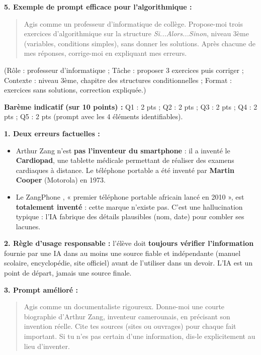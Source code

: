 \documentclass[11pt]{article}
\begin{document}
\begin{corrige}
\textbf{5. Exemple de prompt efficace pour l'algorithmique :}
\begin{quote}
\og Agis comme un professeur d'informatique de collège. Propose-moi trois exercices d'algorithmique sur la structure \emph{Si...Alors...Sinon}, niveau 3ème (variables, conditions simples), sans donner les solutions. Après chacune de mes réponses, corrige-moi en expliquant mes erreurs. \fg
\end{quote}
(Rôle : professeur d'informatique ; Tâche : proposer 3 exercices puis corriger ; Contexte : niveau 3ème, chapitre des structures conditionnelles ; Format : exercices sans solutions, correction expliquée.)

\textbf{Barème indicatif (sur 10 points) :} Q1 : 2 pts ; Q2 : 2 pts ; Q3 : 2 pts ; Q4 : 2 pts ; Q5 : 2 pts (prompt avec les 4 éléments identifiables).
\end{corrige}

\begin{corrige}
\textbf{1. Deux erreurs factuelles :}
\begin{itemize}
    \item Arthur Zang n'est \textbf{pas l'inventeur du smartphone} : il a inventé le \textbf{Cardiopad}, une tablette médicale permettant de réaliser des examens cardiaques à distance. Le téléphone portable a été inventé par \textbf{Martin Cooper} (Motorola) en 1973.
    \item Le \og ZangPhone \fg, « premier téléphone portable africain lancé en 2010 », est \textbf{totalement inventé} : cette marque n'existe pas. C'est une hallucination typique : l'IA fabrique des détails plausibles (nom, date) pour combler ses lacunes.
\end{itemize}

\textbf{2. Règle d'usage responsable :} l'élève doit \textbf{toujours vérifier l'information} fournie par une IA dans au moins une source fiable et indépendante (manuel scolaire, encyclopédie, site officiel) avant de l'utiliser dans un devoir. L'IA est un point de départ, jamais une source finale.

\textbf{3. Prompt amélioré :}
\begin{quote}
\og Agis comme un documentaliste rigoureux. Donne-moi une courte biographie d'Arthur Zang, inventeur camerounais, en précisant son invention réelle. Cite tes sources (sites ou ouvrages) pour chaque fait important. Si tu n'es pas certain d'une information, dis-le explicitement au lieu d'inventer. \fg
\end{quote}
\end{corrige}
\end{document}
